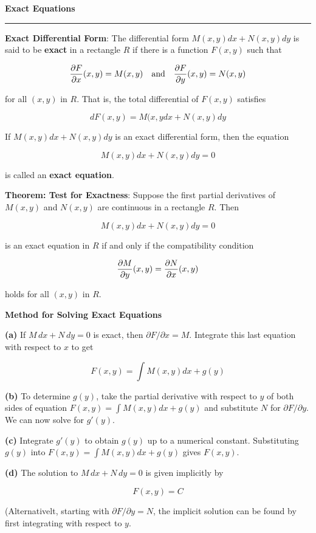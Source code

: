 \nopagenumbers
{\bf Exact Equations}
\vskip 1mm
\hrule

\vskip 6pt
{\bf Exact Differential Form}: The differential form $M(x,y)dx+N(x,y)dy$ is said to be {\bf exact} in a rectangle $R$ if there is a function $F(x,y)$ such that

$${\partial F\over\partial x}(x,y)=M(x,y)\quad\hbox{and}\quad {\partial F\over\partial y}(x,y)=N(x,y)$$

for all $(x,y)$ in $R$. That is, the total differential of $F(x,y)$ satisfies

$$dF(x,y)=M(x,ydx+N(x,y)dy$$

If $M(x,y)dx+N(x,y)dy$ is an exact differential form, then the equation

$$M(x,y)dx+N(x,y)dy=0$$

is called an {\bf exact equation}.

\vskip 6pt
{\bf Theorem: Test for Exactness}: Suppose the first partial derivatives of $M(x,y)$ and $N(x,y)$ are continuous in a rectangle $R$. Then

$$M(x,y)dx+N(x,y)dy=0$$

is an exact equation in $R$ if and only if the compatibility condition

$${\partial M\over\partial y}(x,y)={\partial N\over\partial x}(x,y)$$

holds for all $(x,y)$ in $R$.

\vskip 6pt
{\bf Method for Solving Exact Equations}

\vskip 6pt
{\bf (a)} If $M\, dx+N\, dy=0$ is exact, then $\partial F/\partial x=M$. Integrate this last equation with respect to $x$ to get

$$F(x,y)=\int M(x,y)dx+g(y)$$

\vskip 6pt
{\bf (b)} To determine $g(y)$, take the partial derivative with respect to $y$ of both sides of equation $F(x,y)=\int M(x,y)dx+g(y)$ and substitute $N$ for $\partial F/\partial y$. We can now solve for $g'(y)$.

\vskip 10pt
{\bf (c)} Integrate $g'(y)$ to obtain $g(y)$ up to a numerical constant. Substituting $g(y)$ into $F(x,y)=\int M(x,y)dx+g(y)$ gives $F(x,y)$.

\vskip 10pt
{\bf (d)} The solution to $M\, dx+N\,dy=0$ is given implicitly by

$$F(x,y)=C$$

\vskip 6pt
(Alternativelt, starting with $\partial F/\partial y=N$, the implicit solution can be found by first integrating with respect to $y$.



\vfill\eject
\bye
